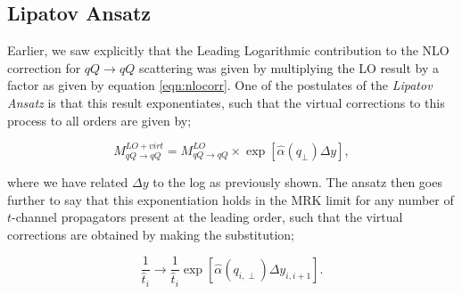 \subsection{Lipatov Ansatz}
Earlier, we saw explicitly that the Leading Logarithmic contribution to the NLO correction for $qQ \to qQ$ scattering was given by multiplying the LO result by a factor as given by equation \ref{eqn:nlocorr}. One of the postulates of the \emph{Lipatov Ansatz} is that this result exponentiates, such that the virtual corrections to this process to all orders are given by;

\begin{equation}
M_{qQ \to qQ}^{LO + virt} = M_{qQ \to qQ}^{LO} \times \exp \left[\hat{\alpha}(q_\perp) \Delta y \right],
\end{equation}

where we have related $\Delta y$ to the log as previously shown. The ansatz then goes further to say that this exponentiation holds in the MRK limit for any number of $t$-channel propagators present at the leading order, such that the virtual corrections are obtained by making the substitution;

\begin{equation}
\frac{1}{\hat{t}_i} \to \frac{1}{\hat{t}_i} \exp \left[\hat{\alpha}(q_{i,\perp}) \Delta y_{i,i+1} \right].
\end{equation}

